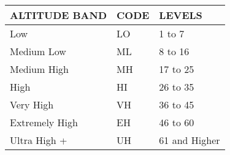 \begin{onecolumntable}
\begin{tabular}{lll}
\toprule
ALTITUDE BAND&CODE&LEVELS\\
\midrule
Low             &LO &1 to 7\\
Medium Low      &ML &8 to 16\\
Medium High     &MH &17 to 25\\
High            &HI &26 to 35\\
Very High       &VH &36 to 45\\
Extremely High  &EH &46 to 60\\
Ultra High +    &UH &61 and Higher\\
\bottomrule
\end{tabular}
\end{onecolumntable}
